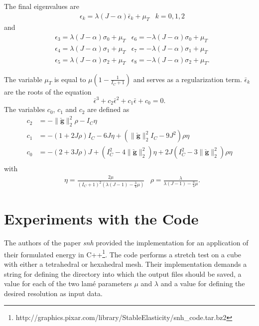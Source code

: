 The final eigenvalues are
\begin{align*}
	&\epsilon_k = \lambda (J-\alpha) \bar{\epsilon}_k + \mu_T		&k = 0, 1, 2
\end{align*}	
and 
\begin{align*}
	&\epsilon_3 = \lambda(J-\alpha)\sigma_0 + \mu_T	&\epsilon_6 = -\lambda (J-\alpha)\sigma_0 + \mu_T \\
	&\epsilon_4 = \lambda(J-\alpha)\sigma_1 + \mu_T	&\epsilon_7 = -\lambda (J-\alpha)\sigma_1 + \mu_T \\
	&\epsilon_5 = \lambda(J-\alpha)\sigma_2 + \mu_T	&\epsilon_8 = -\lambda (J-\alpha)\sigma_2 + \mu_T.
\end{align*}

The variable $\mu_T$ is equal to $\mu(1- \frac{1}{I_C +1})$ and serves as a regularization term. $\bar{\epsilon}_k$ are the roots of the equation
\[
	\bar{\epsilon}^3 + c_2 \bar{\epsilon}^2 + c_1 \bar{\epsilon} + c_0 = 0.
\]
The variables $c_0$, $c_1$ and $c_2$ are defined as
\begin{align*}
	c_2 &= - \|\mathbf{\check{g}}\|^2_2 \rho - I_C \eta \\
	c_1 &= - (1+ 2J\rho)I_C - 6 J \eta + \left( \|\mathbf{\check{g}}\|^2_2 I_C - 9J^2 \right) \rho \eta	\\
	c_0 &= - (2 +3J\rho)J + \left( I_C^2 - 4 \|\mathbf{\check{g}}\|^2_2 \right) \eta + 2J \left( I^2_C -3 \|\mathbf{\check{g}}\|^2_2 \right) \rho \eta 	\\
\end{align*}
with 
\begin{align*}
	&\eta = \frac{2\mu}{(I_C+1)^2 \left( \lambda (J-1) - \frac{3}{4}\mu \right)}		&\rho = \frac{\lambda}{\lambda (J-1) - \frac{3}{4} \mu}.
\end{align*}



\section{Experiments with the Code}
The authors of the paper \textit{\acrshort{snh}} provided the implementation for an application of their formulated energy in C++\footnote{http://graphics.pixar.com/library/StableElasticity/snh\_code.tar.bz2}. The code performs a stretch test on a cube with either a tetrahedral or hexahedral mesh. Their implementation demands a string for defining the directory into which the output files should be saved, a value for each of the two lamé parameters $\mu$ and $\lambda$ and a value for defining the desired resolution as input data.

